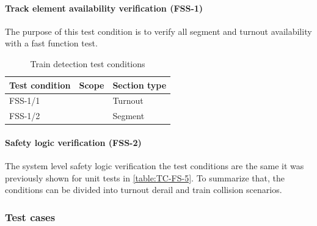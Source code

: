 \paragraph{Track element availability verification (FSS-1)} The purpose of this test condition is to verify all segment and turnout availability with a fast function test. 
\begin{table}[H]
	\caption{Train detection test conditions}
	\label{table:TC-FSS-1}
	\begin{center}
		\renewcommand{\arraystretch}{1.8}
		\begin{tabu} 
			to 0.9 \textwidth
			{  X[c] X[c] X[c] }
			\toprule
			Test condition & Scope                      & Section type \\ \midrule
			FSS-1/1        &  & Turnout      \\
			FSS-1/2        &                            & Segment      \\ \bottomrule
		\end{tabu}
	\end{center}
\end{table} 
\paragraph{Safety logic verification (FSS-2)} The system level safety logic verification the test conditions are the same it was previously shown for unit tests in \autoref{table:TC-FS-5}. To summarize that, the conditions can be divided into turnout derail and train collision scenarios. 

\subsubsection{Test cases}
